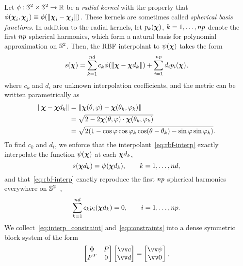Let $\phi:\mathbb{S}^2\times\mathbb{S}^2\to\mathbb{R}$ be a \emph{radial kernel} with the property that
$\phi(\boldsymbol{\chi}_i, \boldsymbol{\chi}_j)\equiv\phi(\|\boldsymbol{\chi}_i-\boldsymbol{\chi}_j\|)$. These kernels are sometimes called \emph{spherical basis
functions}. In addition to the radial kernels, let $p_k(\boldsymbol{\chi})$, $k=1, \ldots, \poly\cardinality$ denote the first
$\poly\cardinality$ spherical harmonics, which form a natural basis for polynomial approximation on $\mathbb{S}^2$.
Then, the RBF interpolant to $\psi(\boldsymbol{\chi})$ takes the form
\begin{equation}\label{eq:rbf-interp}
    s(\Xp)
    = \sum_{k=1}^{\data\cardinality} c_k \phi(\|\Xp-\data\Xp_k\|)
    + \sum_{i=1}^{\poly\cardinality} d_i p_i(\Xp),
\end{equation}
where $c_k$ and $d_i$ are unknown interpolation coefficients, and the metric can be written parametrically as
\begin{equation} \label{eq:param-metric}
    \begin{aligned}
    \|\Xp-\data\Xp_k\|
        &= \|\Xp(\theta, \varphi) - \Xp(\theta_k, \varphi_k)\| \\
        &= \sqrt{2-2\Xp(\theta, \varphi)\cdot\Xp(\theta_k, \varphi_k)} \\ %
        &= \sqrt{2(1 - \cos\varphi\cos\varphi_k\cos(\theta-\theta_k) - \sin\varphi\sin\varphi_k)}.
    \end{aligned}
\end{equation}
To find $c_k$ and $d_i$, we enforce that the interpolant~\eqref{eq:rbf-interp} exactly interpolate the function
$\psi(\boldsymbol{\chi})$ at each $\data\Xp_k$,
\begin{equation}
    s(\data\Xp_k) = \psi(\data\Xp_k), \qquad k=1, \ldots, \data\cardinality,\label{eq:interp_constraint}
\end{equation}
and that~\eqref{eq:rbf-interp} exactly reproduce the first $\poly\cardinality$ spherical harmonics everywhere on
$\mathbb{S}^2$~\cite{Fasshauer:2007ui},
\begin{equation}
    \sum_{k=1}^{\data\cardinality} c_k p_i(\data\Xp_k) = 0, \qquad i=1, \ldots, \poly\cardinality.\label{eq:constraints}
\end{equation}
We collect~\eqref{eq:interp_constraint} and~\eqref{eq:constraints} into a dense symmetric block system of the form
\begin{equation}\label{eq:rbf-interp-matrix}
    \begin{bmatrix}
            \Phi & P \\ P^T & 0
    \end{bmatrix}\begin{bmatrix}
            \arr{c} \\ \arr{d}
    \end{bmatrix} = \begin{bmatrix}
            \arr{\psi} \\ \arr{0}
    \end{bmatrix},
\end{equation}

